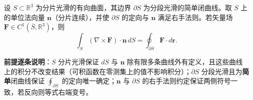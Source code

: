 \begin{theorem}\label{thm:stokes}
设 $S \subset \mathbb{R}^3$ 为分片光滑的有向曲面，其边界 $\partial S$ 为分段光滑的简单闭曲线。取 $S$ 上的单位法向量 $\mathbf n$（分片连续），并使 $\partial S$ 的定向与 $\mathbf n$ 满足右手法则。若矢量场 $\mathbf{F} \in C^1(\overline{S}, \mathbb{R}^3)$，则
\[
\int_S (\nabla \times \mathbf{F}) \cdot \mathbf{n} \, dS = \oint_{\partial S} \mathbf{F} \cdot d\mathbf{r}.
\]

\textbf{前提逐条说明}：$S$ 分片光滑保证 $dS$ 与 $\mathbf n$ 除有限多条曲线外有定义，且这些曲线上的积分不改变结果（可积函数在零测集上的值不影响积分）；$\partial S$ 分段光滑且为\textbf{简单}闭曲线保证 $\oint_{\partial S}$ 的定向唯一确定；$\mathbf n$ 与 $\partial S$ 的右手法则约定保证两侧符号一致，若反向则等式右端变号。
\end{theorem}

